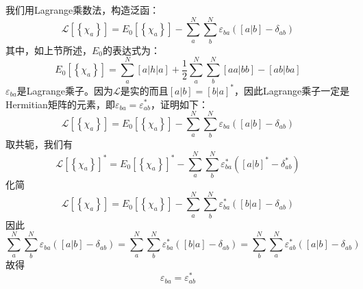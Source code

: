 \documentclass[]{article}
\begin{document}
我们用Lagrange乘数法，构造泛函：
\begin{equation}
	\mathscr{L}\left[ \left\lbrace \chi_a\right\rbrace \right]=E_0\left[ \left\lbrace \chi_a\right\rbrace\right]-\sum\limits_a^N\sum\limits_b^N\varepsilon_{ba}([a|b]-\delta_{ab})
\end{equation}
其中，如上节所述，$E_0$的表达式为：
\begin{equation}
	E_0\left[ \left\lbrace \chi_a\right\rbrace\right] = \sum\limits_a^N [a|h|a]+\frac{1}{2}\sum\limits_a^N \sum\limits_b^N [aa|bb]-[ab|ba]
\end{equation}
$\varepsilon_{ba}$是Lagrange乘子。因为$\mathscr{L}$是实的而且$[a|b]=[b|a]^*$，因此Lagrange乘子一定是Hermitian矩阵的元素，即$\varepsilon_{ba}=\varepsilon_{ab}^*$，证明如下：
\begin{equation}
	\mathscr{L}\left[ \left\lbrace \chi_a\right\rbrace \right]=E_0\left[ \left\lbrace \chi_a\right\rbrace\right]-\sum\limits_a^N\sum\limits_b^N\varepsilon_{ba}([a|b]-\delta_{ab})
\end{equation}
取共轭，我们有
\begin{equation}
	\mathscr{L}\left[ \left\lbrace \chi_a\right\rbrace \right]^*=E_0\left[ \left\lbrace \chi_a\right\rbrace\right]^*-\sum\limits_a^N\sum\limits_b^N\varepsilon_{ba}^*([a|b]^*-\delta_{ab}^*)
\end{equation}
化简
\begin{equation}
	\mathscr{L}\left[ \left\lbrace \chi_a\right\rbrace \right]=E_0\left[ \left\lbrace \chi_a\right\rbrace\right]-\sum\limits_a^N\sum\limits_b^N\varepsilon_{ba}^*([b|a]-\delta_{ab})
\end{equation}
因此
\begin{equation}
	\sum\limits_a^N\sum\limits_b^N\varepsilon_{ba}([a|b]-\delta_{ab})=\sum\limits_a^N\sum\limits_b^N\varepsilon_{ba}^*([b|a]-\delta_{ab})=\sum\limits_b^N\sum\limits_a^N\varepsilon_{ab}^*([a|b]-\delta_{ab})
\end{equation}
故得
\begin{equation}
	\varepsilon_{ba}=\varepsilon_{ab}^*
\end{equation}
\end{document}
